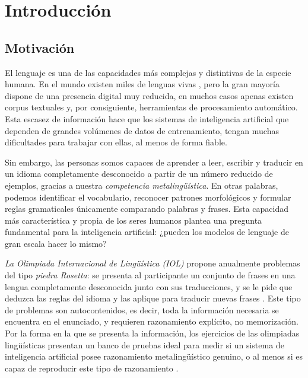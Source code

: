 \chapter{Introducción}
\label{cap:introduccion}

\section{Motivación}

El lenguaje es una de las capacidades más complejas y distintivas de la especie humana. En el mundo existen miles de lenguas vivas \citep{eberhard2020ethnologue}, pero la gran mayoría dispone de una presencia digital muy reducida, en muchos casos apenas existen corpus textuales y, por consiguiente, herramientas de procesamiento automático. Esta escasez de información hace que los sistemas de inteligencia artificial que dependen de grandes volúmenes de datos de entrenamiento, tengan muchas dificultades para trabajar con ellas, al menos de forma fiable.

Sin embargo, las personas somos capaces de aprender a leer, escribir y traducir en un idioma completamente desconocido a partir de un número reducido de ejemplos, gracias a nuestra \textit{competencia metalingüística}. En otras palabras, podemos identificar el vocabulario, reconocer patrones morfológicos y formular reglas gramaticales únicamente comparando palabras y frases. Esta capacidad más característica y propia de los seres humanos plantea una pregunta fundamental para la inteligencia artificial: ¿pueden los modelos de lenguaje de gran escala hacer lo mismo?

\textit{La Olimpiada Internacional de Lingüística (IOL)} propone anualmente problemas del tipo \textit{piedra Rosetta}: se presenta al participante un conjunto de frases en una lengua completamente desconocida junto con sus traducciones, y se le pide que deduzca las reglas del idioma y las aplique para traducir nuevas frases \citep{derzhanski2010linguistics,bozhanov2013rosetta,iol2026problems}. Este tipo de problemas son autocontenidos, es decir, toda la información necesaria se encuentra en el enunciado, y requieren razonamiento explícito, no memorización. Por la forma en la que se presenta la información, los ejercicios de las olimpiadas lingüísticas presentan un banco de pruebas ideal para medir si un sistema de inteligencia artificial posee razonamiento metalingüístico genuino, o al menos si es capaz de reproducir este tipo de razonamiento \citep{sahin2020puzzling,sanchez2024linguini}.

